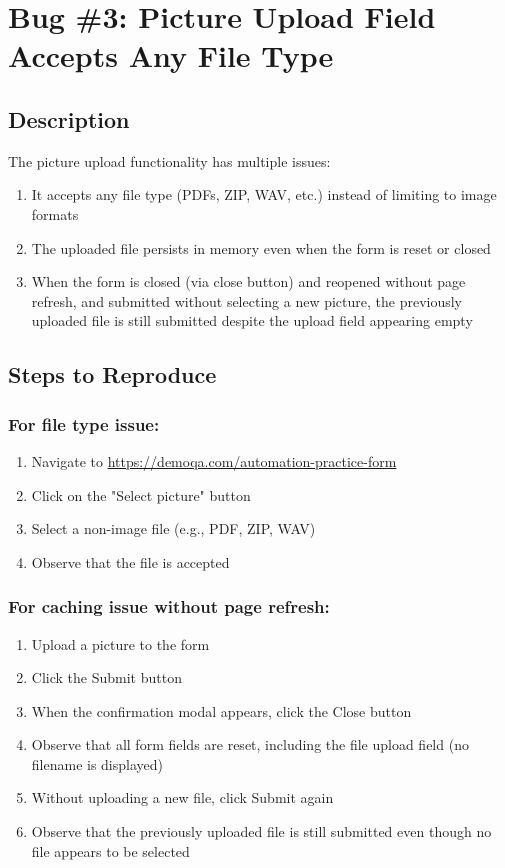 \section{Bug \#3: Picture Upload Field Accepts Any File Type}


\subsection*{Description}
The picture upload functionality has multiple issues:
\begin{enumerate}
    \item It accepts any file type (PDFs, ZIP, WAV, etc.) instead of limiting to image formats
    \item The uploaded file persists in memory even when the form is reset or closed
    \item When the form is closed (via close button) and reopened without page refresh, and submitted without selecting a new picture, the previously uploaded file is still submitted despite the upload field appearing empty
\end{enumerate}

\subsection*{Steps to Reproduce}
\subsubsection*{For file type issue:}
\begin{enumerate}
    \item Navigate to \url{https://demoqa.com/automation-practice-form}
    \item Click on the "Select picture" button
    \item Select a non-image file (e.g., PDF, ZIP, WAV)
    \item Observe that the file is accepted
\end{enumerate}

\subsubsection*{For caching issue without page refresh:}
\begin{enumerate}
    \item Upload a picture to the form
    \item Click the Submit button
    \item When the confirmation modal appears, click the Close button
    \item Observe that all form fields are reset, including the file upload field (no filename is displayed)
    \item Without uploading a new file, click Submit again
    \item Observe that the previously uploaded file is still submitted even though no file appears to be selected
\end{enumerate}

